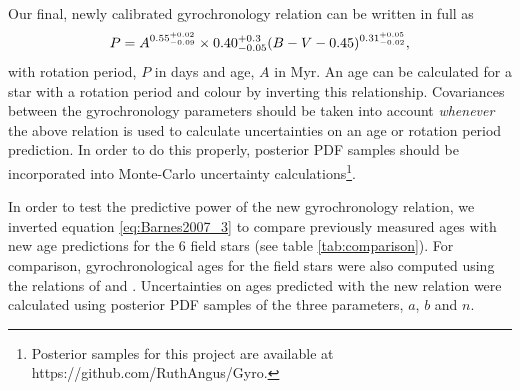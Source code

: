 Our final, newly calibrated gyrochronology relation can be written in full as
\begin{equation}
	P = A^{0.55^{+0.02}_{-0.09}} \times 0.40^{+0.3}_{-0.05}
	(B-V-0.45)^{0.31^{+0.05}_{-0.02}},
\label{eq:Barnes2007_3}
\end{equation}
with rotation period, $P$ in days and age, $A$ in Myr.
An age can be calculated for a star with a rotation period and colour by
inverting this relationship.
Covariances between the gyrochronology parameters should
be taken into account {\it whenever} the above relation is used to calculate
uncertainties on an age or rotation period prediction.
In order to do this properly, posterior PDF samples should be incorporated
into Monte-Carlo uncertainty calculations\footnote{Posterior samples for
this project are available at https://github.com/RuthAngus/Gyro.}.

In order to test the predictive power of the new gyrochronology relation, we
inverted equation \ref{eq:Barnes2007_3} to compare previously measured ages
with new age predictions for the 6 field stars (see table
\ref{tab:comparison}).
For comparison, gyrochronological ages for the field stars were also computed
using the relations of \citet{Barnes2007} and \citet{Mamajek2008}.
Uncertainties on ages predicted with the new relation were calculated using
posterior PDF samples of the three parameters, $a$, $b$ and $n$.

